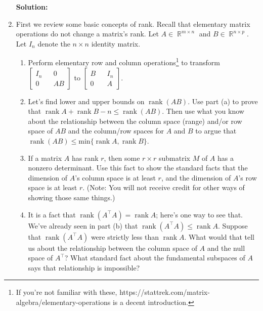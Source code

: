 \documentclass{article}
\DeclareMathOperator{\rank}{\mathrm{rank}}
\DeclareMathOperator{\R}{\mathbb{R}}
\newenvironment{solution}{\color{blue} \smallskip \textbf{Solution:}}{}
\begin{document}
\begin{enumerate}
\begin{solution}
\begin{enumerate}[(a)]
        \end{enumerate}

    \end{solution}

    \item 
    First we review some basic concepts of rank. 
    Recall that elementary matrix operations do not change a matrix's rank. 
    Let $A \in \R^{m \times n}$ and $B \in \R^{n \times p}$. 
    Let $I_n$ denote the $n \times n$ identity matrix.
    \begin{enumerate}
        \item
        Perform elementary row and column operations\footnote{
        If you're not familiar with these, https://stattrek.com/matrix-algebra/elementary-operations is a decent introduction.
        } to transform $\begin{bmatrix} I_n && 0 \\ 0 && AB \end{bmatrix}$ to $\begin{bmatrix} B && I_n \\ 0 && A \end{bmatrix}$.
     
        \item
        Let's find lower and upper bounds on $\rank(AB)$. 
        Use part (a) to prove that $\rank A+\rank B - n \leq \rank (AB)$.
        Then use what you know about the relationship between the column space (range) and/or row space of $AB$ and the column/row spaces for $A$ and $B$ to argue that $\rank (AB) \leq \text{min}\{\rank A,\rank B\}$.
    
        \item
        If a matrix $A$ has rank $r$, then some $r \times r$ submatrix $M$ of $A$ has a nonzero determinant.
        Use this fact to show the standard facts that the dimension of $A$'s column space is at least $r$, and the dimension of $A$'s row space is at least $r$.
        (Note: You will not receive credit for other ways of showing those same things.)
    
        \item
        It is a fact that $\rank (A^\top A) = \rank A$; here's one way to see that.
        We've already seen in part (b) that $\rank (A^\top A) \leq \rank A$.
        Suppose that $\rank (A^\top A)$ were strictly less than $\rank A$.
        What would that tell us about the relationship between the column space of $A$ and the null space of $A^\top$?
        What standard fact about the fundamental subspaces of $A$ says that relationship is impossible?
    

\end{enumerate}
\end{enumerate}
\end{document}
